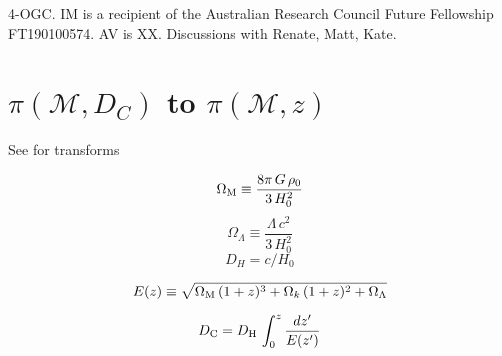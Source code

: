 \documentclass[twocolumn]{aastex631}
\begin{document}
4-OGC.
IM is a recipient of the Australian Research Council Future Fellowship FT190100574.
AV is XX.
Discussions with Renate, Matt, Kate.



\vspace{5mm}










\appendix

\section{$\pi(\mathcal{M}, D_{C})$ to $\pi(\mathcal{M}, z)$}

See \cite{Hogg:1999:arXiv} for transforms

\begin{equation}
\Omega_{\rm M}\equiv\frac{8\pi\,G\,\rho_0}{3\,H_0^2}
\end{equation}
\begin{equation}
\Omega_{\Lambda}\equiv\frac{\Lambda\,c^2}{3\,H_0^2}
\end{equation}
\begin{equation}
    D_H = c / H_0
\end{equation}


\begin{equation}
\label{eq:ez}
E(z)\equiv\sqrt{\Omega_{\rm M}\,(1+z)^3+\Omega_k\,(1+z)^2+\Omega_{\Lambda}}
\end{equation}

\begin{equation}
D_{\rm C} = D_{\rm H}\,\int_0^z\frac{dz'}{E(z')}
\end{equation}
\end{document}
